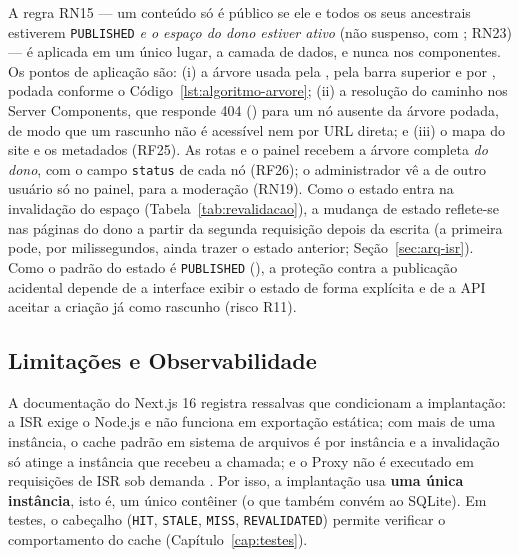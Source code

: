 A regra RN15 --- um conteúdo só é público se ele e todos os seus ancestrais estiverem \texttt{PUBLISHED} \emph{e o espaço do dono estiver ativo} (não suspenso, com ; RN23) --- é aplicada em um único lugar, a camada de dados, e nunca nos componentes. Os pontos de aplicação são: (i) a árvore usada pela , pela barra superior e por , podada conforme o Código~\ref{lst:algoritmo-arvore}; (ii) a resolução do caminho nos Server Components, que responde 404 () para um nó ausente da árvore podada, de modo que um rascunho não é acessível nem por URL direta; e (iii) o mapa do site e os metadados (RF25). As rotas  e o painel recebem a árvore completa \emph{do dono}, com o campo \texttt{status} de cada nó (RF26); o administrador vê a de outro usuário só no painel, para a moderação (RN19). Como o estado entra na invalidação do espaço (Tabela~\ref{tab:revalidacao}), a mudança de estado reflete-se nas páginas do dono a partir da segunda requisição depois da escrita (a primeira pode, por milissegundos, ainda trazer o estado anterior; Seção~\ref{sec:arq-isr}). Como o padrão do estado é \texttt{PUBLISHED} (), a proteção contra a publicação acidental depende de a interface exibir o estado de forma explícita e de a API aceitar a criação já como rascunho (risco R11).



\subsection{Limitações e Observabilidade}

A documentação do Next.js 16 registra ressalvas que condicionam a implantação: a ISR exige o  Node.js e não funciona em exportação estática; com mais de uma instância, o cache padrão em sistema de arquivos é por instância e a invalidação só atinge a instância que recebeu a chamada; e o Proxy não é executado em requisições de ISR sob demanda \cite{nextjsdocs}. Por isso, a implantação usa \textbf{uma única instância}, isto é, um único contêiner (o que também convém ao SQLite). Em testes, o cabeçalho  (\texttt{HIT}, \texttt{STALE}, \texttt{MISS}, \texttt{REVALIDATED}) permite verificar o comportamento do cache (Capítulo~\ref{cap:testes}).
